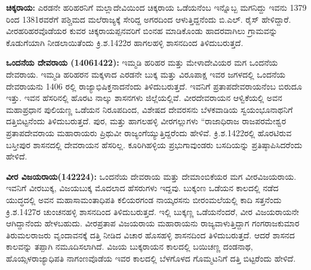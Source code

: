 \textbf{ ಚಿಕ್ಕರಾಯ:} ಎರಡನೇ ಹರಿಹರನಿಗೆ ಮಲ್ಲಾದೇವಿಯಿಂದ ಚಿಕ್ಕರಾಯ ಒಡೆಯನೆಂಬ ಇನ್ನೊಬ್ಬ ಮಗನಿದ್ದು ಇವನು 1379 ರಿಂದ 1381ರವರೆಗೆ ಪಶ್ಚಿಮದ ಮಲೆರಾಜ್ಯಕ್ಕೆ ಸೇರಿದ್ದ ಅಗರದಿಂದ ಆಳುತ್ತಿದ್ದನೆಂದು ಬಿ.ಎಲ್​. ರೈಸ್​ ಹೇಳಿದ್ದಾರೆ. ವೀರಹರಿಹರವೊಡೆಯರ ಕುವರ ಚಿಕ್ಕರಾಯಪ್ಪನವರಿಗೆ ಬಿಂನಹ ಮಾಡಿಕೊಂಡು ಹಾದರವಾಗಿಲು ಗ್ರಾಮವನ್ನು ಕೊಡುಗೆಯಾಗಿ ನೀಡಲಾಯಿತೆಂದು ಕ್ರಿ.ಶ.1422ರ ಹಾಗಲಹಳ್ಳಿ ಶಾಸನದಿಂದ ತಿಳಿದುಬರುತ್ತದೆ.

\textbf{ಒಂದನೆಯ ದೇವರಾಯ (1406\general{\enginline{-}}1422): } ಇಮ್ಮಡಿ ಹರಿಹರ ಮತ್ತು ಮೇಳಾದೇವಿಯರ ಮಗ ಒಂದನೆಯ ದೇವರಾಯ. ಇಮ್ಮಡಿ ಹರಿಹರನ ಮಕ್ಕಳಾದ ಎರಡನೇ ಬುಕ್ಕ ಮತ್ತು ವಿರೂಪಾಕ್ಷ ಇವರ ಜಗಳದಲ್ಲಿ ಒಂದನೆಯ ದೇವರಾಯನು 1406 ರಲ್ಲಿ ರಾಜ್ಯಾಭಿಷಿಕ್ತನಾದನೆಂದು ತಿಳಿದುಬರುತ್ತದೆ. ಇವನಿಗೆ ಪ್ರತಾಪದೇವರಾಯನೆಂಬ ಬಿರುದೂ ಇತ್ತು. ಇವನ ಹೆಸರಿನಲ್ಲಿ ಹೊರಟ ನಾಲ್ಕು ಶಾಸನಗಳು ಜಿಲ್ಲೆಯಲ್ಲಿವೆ. ವೀರದೇವರಾಯನ ಆಳ್ವಿಕೆಯಲ್ಲಿ ಅವನ ಮಹಾಪ್ರಧಾನ ಪುಲಿಯಣ್ಣ ಒಡೆಯನ ನಿರೂಪದಿಂದ, ವಿಶೇಷದ ದೇವರಸನು ಬೆಳಕವಾಡಿಯ ಸ್ವಯಂಭೂನಾಥನಿಗೆ ದತ್ತಿಬಿಟ್ಟನೆಂದು ತಿಳಿದುಬರುತ್ತದೆ. ಪುರ, ಮತ್ತು ಹಾಗಲಹಳ್ಳಿ ವೀರಗಲ್ಲುಗಳು “ರಾಜಾಧಿರಾಜ ರಾಜಪರಮೇಶ್ವರ ಪ್ರತಾಪದೇವರಾಯ ಮಹಾರಾಯರು ಪ್ರಿಥುವೀ ರಾಜ್ಯಂಗೆಯ್ಯುತ್ತಿದ್ದರೆಂದು ಹೇಳಿವೆ. ಕ್ರಿ.ಶ.1422ರಲ್ಲಿ ಹೊರಟಿರುವ ಬಸ್ತೀಪುರ ಶಾಸನದಲ್ಲಿ ದೇವರಾಯನ ಹೆಸರಿಲ್ಲ. ಕೂರಿಗಿಹಳ್ಳಿಯ ಪ್ರಭುಗಾವುಂಡರು ಬಸದಿಯನ್ನು ಪ್ರತಿಷ್ಠಾಪಿಸಿದರೆಂದು ಹೇಳಿದೆ.

\textbf{ವೀರ ವಿಜಯರಾಯ(1422\general{\enginline{-}}24):} ಒಂದನೆಯ ದೇವರಾಯ ಮತ್ತು ದೇಮಾಂಬಿಕೆಯರ ಮಗ ವೀರವಿಜಯರಾಯ. ಇವನಿಗೆ ವೀರಬುಕ್ಕ, ವಿಜಯಬುಕ್ಕ ಮೊದಲಾದ ಹೆಸರುಗಳು ಇದ್ದವು. ಬುಕ್ಕಂಣ ಒಡೆಯನ ಕಾಲದಲ್ಲಿ ನಡೆದ ಯುದ್ಧದಲ್ಲಿ ಅವನ ಮಹಾಸಾಮಂತಾಧಿಪತಿ ಕಲಿಯರಗಂಡ ನಾಯ್ಕರಸನು ಬೀರಂಮಲೆಯಲ್ಲಿ ಕಾದಿ ಸತ್ತನೆಂದು ಕ್ರಿ.ಶ.1427ರ ಚುಂಚನಹಳ್ಳಿ ಶಾಸನದಿಂದ ತಿಳಿದುಬರುತ್ತದೆ. ಇಲ್ಲಿ ಬುಕ್ಕಣ್ಣ ಒಡೆಯನೆಂದರೆ, ವೀರ ವಿಜಯರಾಯನೇ ಆಗಿದ್ದಾನೆಂದು ಹೇಳಬಹುದು. ವೀರಪ್ರತಾಪ ವಿಜಯರಾಯ ಮಹಾರಾಯನು ರಾಜ್ಯವಾಳುತ್ತಿದ್ದಾಗ ಗಂಗರಾಜಕುಮಾರ ತಿರುಮಲರಾಜರು ವೃಂದಾವನಕ್ಕೆ ದತ್ತಿ ನೀಡಿದ ವಿಚಾರ ಹೊಸಹಳ್ಳಿ ಶಾಸನದಿಂದ ತಿಳಿದುಬರುತ್ತದೆ. ಆದರೆ ಶಾಸನದ ಕಾಲವನ್ನು ತಪ್ಪಾಗಿ ನಮೂದಿಸಲಾಗಿದೆ. ವಿಜಯ ಬುಕ್ಕರಾಯನ ಕಾಲದಲ್ಲಿ ಬಯಿಚಣ್ಣ ದಂಡನಾಥ, ಹೊಯ್ಸಳರಾಜ್ಯಾಧಿಪತಿ ನಾಗಂಣವೊಡೆಯ ಇವರ ಕಾಲದಲ್ಲಿ ಬೆಳಗೊಳದ ಗೊಮ್ಮಟನಿಗೆ ದತ್ತಿ ಬಿಟ್ಟರೆಂದು ಹೇಳಿದೆ.

